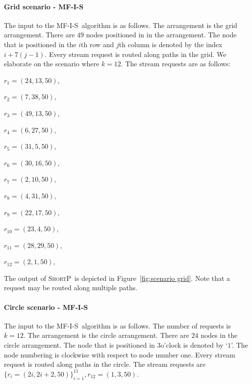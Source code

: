 \documentclass[12pt]{article}
\newenvironment{proof sketch}[1]{\noindent {\emph{Proof sketch of #1:}}}{\hfill \qed}
\newcommand{\algA}{\textsc{MF-I-S}}
\newcommand{\algB}{\textsc{ShortP}}
\newcommand{\algS}{\algB}
\begin{document}
\paragraph{Grid scenario - \algA}
The input to the \algA\ algorithm is as follows.
The arrangement is the grid arrangement.
There are $49$ nodes positioned in in the arrangement.
The node that is positioned in the $i$th row and $j$th column is denoted by the index $i+7(j-1)$.
Every stream request is routed along paths in the grid.
We elaborate on the scenario where $k=12$.
The stream requests are as follows:
\begin{inparaenum}[(i)]
\item $r_1 = (24,13,50)$,
\item $r_2 = (7,38,50)$,
\item $r_3 = (49,13,50)$,
\item $r_4 = (6,27,50)$,
\item $r_5 = (31,5,50)$,
\item $r_6 = (30,16,50)$,
\item $r_7 = (2,10,50)$,
\item $r_8 = (4,31,50)$,
\item $r_9 = (22,17,50)$,
\item $r_{10} = (23,4,50)$,
\item $r_{11} = (28,29,50)$,
\item $r_{12} = (2,1,50)$,
\end{inparaenum}

The output of \algS\ is depicted in Figure~\ref{fig:scenario grid}.
Note that a request may be routed along multiple paths.




\paragraph{Circle scenario - \algA}
The input to the \algA\ algorithm is as follows.
The number of requests is $k=12$.
The arrangement is the circle arrangement.
There are $24$ nodes in the circle arrangement.
The node that is positioned in $3$o'clock is denoted by `$1$'.
The node numbering is clockwise with respect to node number one.
Every stream request is routed along paths in the circle.
The stream requests are $\{r_i=(2i,2i+2,50)\}_{i=1}^{11},r_{12}=(1,3,50)$.
\end{document}
